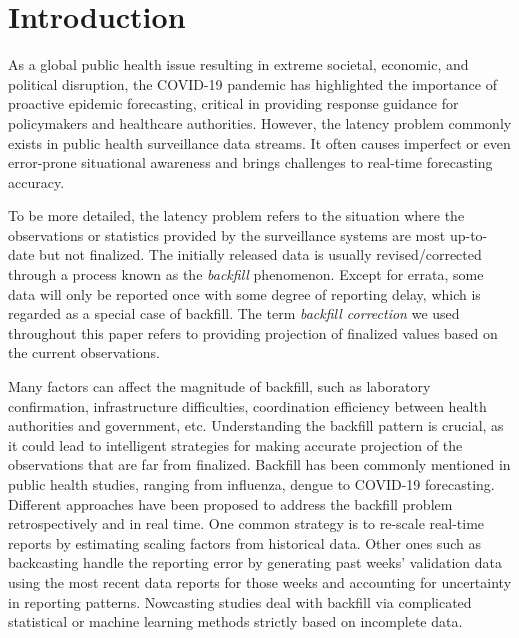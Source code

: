 \section{Introduction}

As a global public health issue resulting in extreme societal, economic, and political disruption, the COVID-19 pandemic has highlighted the importance of proactive epidemic forecasting, critical in providing response guidance for policymakers and healthcare authorities. However, the latency problem commonly exists in public health surveillance data streams. It often causes imperfect or even error-prone situational awareness \cite{McGough2020}\cite{Rosenfeld2021} and brings challenges to real-time forecasting accuracy. 

To be more detailed, the latency problem refers to the situation where the observations or statistics provided by the surveillance systems are most up-to-date but not finalized. The initially released data is usually revised/corrected through a process known as the \textit{backfill} phenomenon. Except for errata, some data will only be reported once with some degree of reporting delay, which is regarded as a special case of backfill. The term \textit{backfill correction} we used throughout this paper refers to providing projection of finalized values based on the current observations.

Many factors can affect the magnitude of backfill, such as laboratory confirmation, infrastructure difficulties, coordination efficiency between health authorities and government\cite{reich2019collaborative}\cite{Chakraborty2018}, etc. Understanding the backfill pattern is crucial, as it could lead to intelligent strategies for making accurate projection of the observations that are far from finalized. Backfill has been commonly mentioned in public health studies, ranging from influenza\cite{chakraborty2018know}, dengue\cite{rangarajan2019forecasting} to COVID-19 forecasting\cite{rodriguez2021deepcovid}. Different approaches have been proposed to address the backfill problem retrospectively and in real time. One common strategy is to re-scale real-time reports by estimating scaling factors from historical data\cite{lawless1994adjustments}\cite{hohle2014bayesian}. Other ones such as backcasting handle the reporting error by generating past weeks’ validation data using the most recent data reports for those weeks and accounting for uncertainty in reporting patterns\cites{brooks2018nonmechanistic}. Nowcasting studies deal with backfill via complicated statistical or machine learning methods\cite{li2021bayesian}\cite{mjahja2021} strictly based on incomplete data. 

